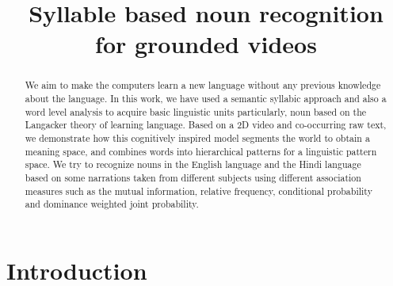 \documentclass[compsoc]{IEEEtran}
\begin{document}
\title{Syllable based noun recognition\\for grounded videos}
\author{
}

\maketitle


\begin{abstract}
We aim to make the computers learn a new language without any previous knowledge about the language. In this work, we have used a semantic syllabic approach and also a word level analysis to acquire basic linguistic units particularly, noun based on the Langacker\cite{} theory of learning language. Based on a 2D video and co-occurring raw text, we demonstrate how this cognitively inspired model segments the world to obtain a meaning space, and combines words into hierarchical patterns for a linguistic pattern space. We try to recognize nouns in the English language and the Hindi language based on some narrations taken from different subjects using different association measures such as the mutual information, relative frequency, conditional probability and dominance weighted joint probability.
\end{abstract}


\section{Introduction}
\vspace{10px}
\end{document}
